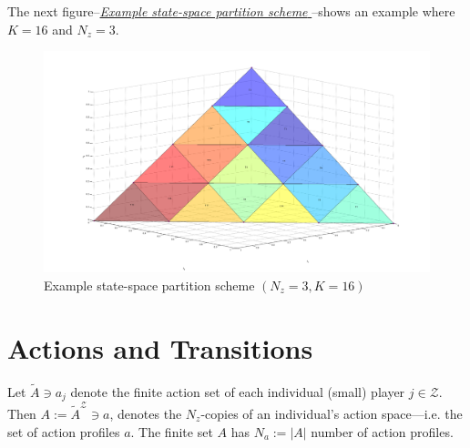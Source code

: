 \documentclass[a4paper,10pt,english]{sphinxmanual}
\begin{document}
The next figure--{\hyperref[statespace:figure-partition]{\emph{Example state-space partition scheme }}}--shows an example where $K = 16$ and $N_z = 3$.
\begin{figure}[htbp]
\centering
\capstart

\includegraphics[width=0.900\linewidth]{partition.png}
\caption{Example state-space partition scheme $(N_z = 3, K = 16)$}\label{statespace:figure-partition}\end{figure}


\chapter{Actions and Transitions}
\label{actions_transitions::doc}\label{actions_transitions:actions-and-transitions}
Let $\tilde{A} \ni a_{j}$ denote the finite action set of each individual (small)
player $j \in \mathcal{Z}$. Then $A := \tilde{A}^{\mathcal{Z}} \ni a$, denotes the
$N_{z}$-copies of an individual's action space---i.e. the set of action
profiles $a$. The finite  set $A$ has $N_{a} := |A|$ number of
action profiles.
\end{document}
